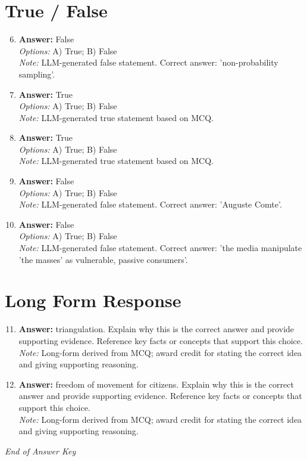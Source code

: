 \documentclass[12pt]{article}
\begin{document}
\section*{True / False}
\begin{enumerate}[label=\arabic*.]
\setcounter{enumi}{5}
\item \textbf{Answer:} False
\\ \textit{Options:} A) True; B) False
\\ \textit{Note:} LLM-generated false statement. Correct answer: 'non-probability sampling'.
\item \textbf{Answer:} True
\\ \textit{Options:} A) True; B) False
\\ \textit{Note:} LLM-generated true statement based on MCQ.
\item \textbf{Answer:} True
\\ \textit{Options:} A) True; B) False
\\ \textit{Note:} LLM-generated true statement based on MCQ.
\item \textbf{Answer:} False
\\ \textit{Options:} A) True; B) False
\\ \textit{Note:} LLM-generated false statement. Correct answer: 'Auguste Comte'.
\item \textbf{Answer:} False
\\ \textit{Options:} A) True; B) False
\\ \textit{Note:} LLM-generated false statement. Correct answer: 'the media manipulate 'the masses' as vulnerable, passive consumers'.
\end{enumerate}

\section*{Long Form Response}
\begin{enumerate}[label=\arabic*.]
\setcounter{enumi}{10}
\item \textbf{Answer:} triangulation. Explain why this is the correct answer and provide supporting evidence. Reference key facts or concepts that support this choice.
\\ \textit{Note:} Long-form derived from MCQ; award credit for stating the correct idea and giving supporting reasoning.
\item \textbf{Answer:} freedom of movement for citizens. Explain why this is the correct answer and provide supporting evidence. Reference key facts or concepts that support this choice.
\\ \textit{Note:} Long-form derived from MCQ; award credit for stating the correct idea and giving supporting reasoning.
\end{enumerate}

\vfill
\noindent\textit{End of Answer Key}
\end{document}
